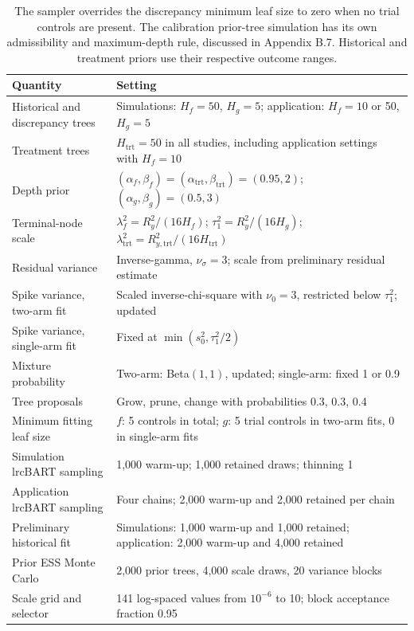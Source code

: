 \begin{table}[htbp]
\centering\small
\caption{lrcBART prior and computation settings.}\label{tab:S1}
\begin{tabular}{p{2.1in}p{3.8in}}
\toprule
Quantity & Setting\\\midrule
Historical and discrepancy trees & Simulations: $H_f=50$, $H_g=5$; application: $H_f=10$ or 50, $H_g=5$\\
Treatment trees & $H_{\mathrm{trt}}=50$ in all studies, including application settings with $H_f=10$\\
Depth prior & $(\alpha_f,\beta_f)=(\alpha_{\mathrm{trt}},\beta_{\mathrm{trt}})=(0.95,2)$; $(\alpha_g,\beta_g)=(0.5,3)$\\
Terminal-node scale & $\lambda_f^2=R_y^2/(16H_f)$; $\tau_1^2=R_y^2/(16H_g)$; $\lambda_{\mathrm{trt}}^2=R_{y,\mathrm{trt}}^2/(16H_{\mathrm{trt}})$\\
Residual variance & Inverse-gamma, $\nu_\sigma=3$; scale from preliminary residual estimate\\
Spike variance, two-arm fit & Scaled inverse-chi-square with $\nu_0=3$, restricted below $\tau_1^2$; updated\\
Spike variance, single-arm fit & Fixed at $\min(s_0^2,\tau_1^2/2)$\\
Mixture probability & Two-arm: Beta$(1,1)$, updated; single-arm: fixed 1 or 0.9\\
Tree proposals & Grow, prune, change with probabilities 0.3, 0.3, 0.4\\
Minimum fitting leaf size & $f$: 5 controls in total; $g$: 5 trial controls in two-arm fits, 0 in single-arm fits\\
Simulation lrcBART sampling & 1,000 warm-up; 1,000 retained draws; thinning 1\\
Application lrcBART sampling & Four chains; 2,000 warm-up and 2,000 retained per chain\\
Preliminary historical fit & Simulations: 1,000 warm-up and 1,000 retained; application: 2,000 warm-up and 4,000 retained\\
Prior ESS Monte Carlo & 2,000 prior trees, 4,000 scale draws, 20 variance blocks\\
Scale grid and selector & 141 log-spaced values from $10^{-6}$ to 10; block acceptance fraction 0.95\\
\bottomrule
\end{tabular}
\caption*{The sampler overrides the discrepancy minimum leaf size to zero when no trial controls are present. The calibration prior-tree simulation has its own admissibility and maximum-depth rule, discussed in Appendix B.7. Historical and treatment priors use their respective outcome ranges.}
\end{table}

